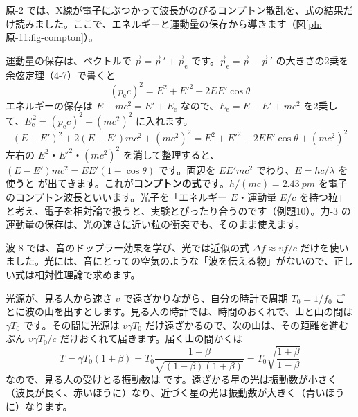 原-2 では、X線が電子にぶつかって波長がのびるコンプトン散乱を、式の結果だけ読みました。ここで、エネルギーと運動量の保存から導きます（図\ref{ph:原-11:fig-compton}）。
\begin{bkfigure}
\label{ph:原-11:fig-compton}
\end{bkfigure}
運動量の保存は、ベクトルで $\vec p=\vec p\,'+\vec p_{\mathrm e}$ です。$\vec p_{\mathrm e}=\vec p-\vec p\,'$ の大きさの2乗を余弦定理（4-7）で書くと
\[ (p_{\mathrm e}c)^2=E^2+E'^2-2EE'\cos\theta \]
エネルギーの保存は $E+mc^2=E'+E_{\mathrm e}$ なので、$E_{\mathrm e}=E-E'+mc^2$ を2乗して、$E_{\mathrm e}^{\,2}=(p_{\mathrm e}c)^2+(mc^2)^2$ に入れます。
\[ (E-E')^2+2(E-E')mc^2+(mc^2)^2=E^2+E'^2-2EE'\cos\theta+(mc^2)^2 \]
左右の $E^2$・$E'^2$・$(mc^2)^2$ を消して整理すると、$(E-E')mc^2=EE'(1-\cos\theta)$ です。両辺を $EE'mc^2$ でわり、$E=hc/\lambda$ を使うと
\label{ph:原-11:compton}が出てきます。これが\textbf{コンプトンの式}です。$h/(mc)=\qty{2.43}{pm}$ を電子のコンプトン波長といいます。光子を「エネルギー $E$・運動量 $E/c$ を持つ粒」と考え、電子を相対論で扱うと、実験とぴったり合うのです（例題10）。力-3 の運動量の保存は、光の速さに近い粒の衝突でも、そのまま使えます。

\label{ph:原-11:sec9}
波-8 では、音のドップラー効果を学び、光では近似の式 $\Delta f\approx vf/c$ だけを使いました。光には、音にとっての空気のような「波を伝える物」がないので、正しい式は相対性理論で求めます。

光源が、見る人から速さ $v$ で遠ざかりながら、自分の時計で周期 $T_0=1/f_0$ ごとに波の山を出すとします。見る人の時計では、時間のおくれで、山と山の間は $\gamma T_0$ です。その間に光源は $v\gamma T_0$ だけ遠ざかるので、次の山は、その距離を進むぶん $v\gamma T_0/c$ だけおくれて届きます。届く山の間かくは
\[ T=\gamma T_0(1+\beta)=T_0\frac{1+\beta}{\sqrt{(1-\beta)(1+\beta)}}=T_0\sqrt{\frac{1+\beta}{1-\beta}} \]
なので、見る人の受けとる振動数は
\label{ph:原-11:doppler}です。遠ざかる星の光は振動数が小さく（波長が長く、赤いほうに）なり、近づく星の光は振動数が大きく（青いほうに）なります。

